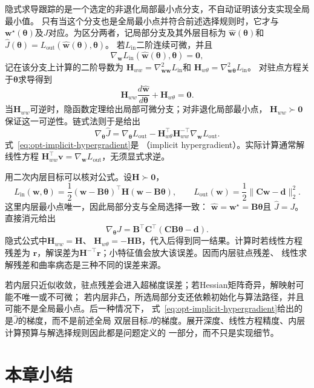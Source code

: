 隐式求导跟踪的是一个选定的非退化局部最小点分支，不自动证明该分支实现全局最小值。
只有当这个分支也是全局最小点并符合前述选择规则时，它才与
$\bm{w}^{\star}(\bm{\theta})$及$J$对应。为区分两者，记局部分支及其外层目标为
$\widehat{\bm{w}}(\bm{\theta})$和
$\widehat{J}(\bm{\theta})
=L_{\mathrm{out}}(\widehat{\bm{w}}(\bm{\theta}),\bm{\theta})$。
若$L_{\mathrm{in}}$二阶连续可微，并且
\[
  \nabla_{\bm{w}}L_{\mathrm{in}}
  (\widehat{\bm{w}}(\bm{\theta}),\bm{\theta})=\bm{0},
\]
记在该分支上计算的二阶导数为
$\bm{H}_{ww}=\nabla_{\bm{w}\bm{w}}^2L_{\mathrm{in}}$和
$\bm{H}_{w\theta}=\nabla_{\bm{w}\bm{\theta}}^2L_{\mathrm{in}}$。
对驻点方程关于$\bm{\theta}$求导得到
\[
  \bm{H}_{ww}\frac{d\widehat{\bm{w}}}{d\bm{\theta}}
  +\bm{H}_{w\theta}=\bm{0}.
\]
当$\bm{H}_{ww}$可逆时，隐函数定理给出局部可微分支；对非退化局部最小点，
$\bm{H}_{ww}\succ\bm{0}$保证这一可逆性。链式法则于是给出
\begin{equation}
  \nabla_{\bm{\theta}}\widehat{J}
  =
  \nabla_{\bm{\theta}}L_{\mathrm{out}}
  -\bm{H}_{w\theta}^{\top}
  \bm{H}_{ww}^{-\top}
  \nabla_{\bm{w}}L_{\mathrm{out}}.
  \label{eq:opt-implicit-hypergradient}
\end{equation}
式~\eqref{eq:opt-implicit-hypergradient}是
（implicit hypergradient）。实际计算通常解线性方程
$\bm{H}_{ww}^{\top}\bm{v}=\nabla_{\bm{w}}L_{\mathrm{out}}$，无须显式求逆。

用二次内层目标可以核对公式。设$\bm{H}\succ\bm{0}$，
\[
  L_{\mathrm{in}}(\bm{w},\bm{\theta})
  =\frac12(\bm{w}-\bm{B}\bm{\theta})^{\top}
  \bm{H}(\bm{w}-\bm{B}\bm{\theta}),\qquad
  L_{\mathrm{out}}(\bm{w})
  =\frac12\lVert\bm{C}\bm{w}-\bm{d}\rVert_2^2.
\]
这里内层最小点唯一，因此局部分支与全局选择一致：
$\widehat{\bm{w}}=\bm{w}^{\star}=\bm{B}\bm{\theta}$且
$\widehat{J}=J$。直接消元给出
\[
  \nabla_{\bm{\theta}}J
  =\bm{B}^{\top}\bm{C}^{\top}
  (\bm{C}\bm{B}\bm{\theta}-\bm{d}).
\]
隐式公式中$\bm{H}_{ww}=\bm{H}$、
$\bm{H}_{w\theta}=-\bm{H}\bm{B}$，代入后得到同一结果。计算时若线性方程残差为
$\bm{r}$，解误差为$\bm{H}^{-\top}\bm{r}$；小特征值会放大该误差。因而内层驻点残差、
线性求解残差和曲率病态是三种不同的误差来源。

若内层只近似收敛，驻点残差会进入超梯度误差；若Hessian矩阵奇异，解映射可能不唯一或不可微；
若内层非凸，所选局部分支还依赖初始化与算法路径，并且可能不是全局最小点。后一种情况下，
式~\eqref{eq:opt-implicit-hypergradient}给出的是$\widehat{J}$的梯度，而不是前述全局
双层目标$J$的梯度。展开深度、线性方程精度、内层计算预算与解选择规则因此都是问题定义的
一部分，而不只是实现细节。

\section{本章小结}
\label{sec:opt-summary}

